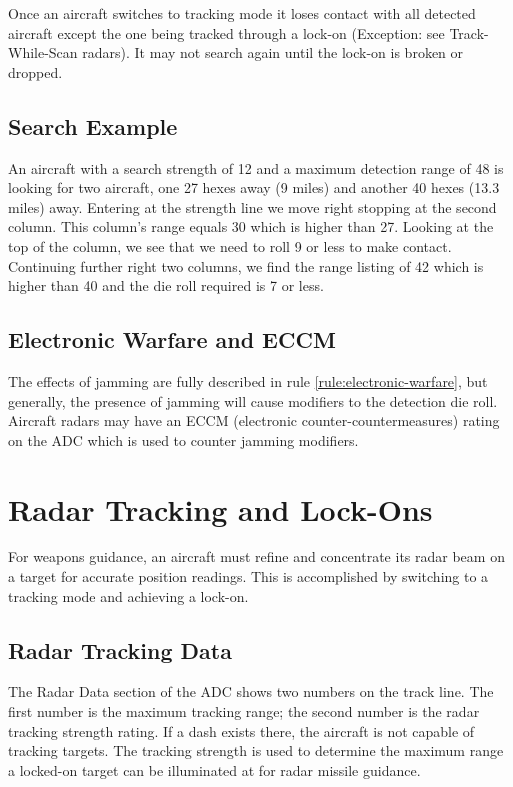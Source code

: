 Once an aircraft switches to tracking mode it loses contact with all detected aircraft except the one being tracked through a lock-on (Exception: see Track-While-Scan radars). It may not search again until the lock-on is broken or dropped. 

\subsection{Search Example} An aircraft with a search strength of 12 and a maximum detection range of 48 is looking for two aircraft, one 27 hexes away (9 miles) and another 40 hexes (13.3 miles) away. Entering at the strength line we move right stopping at the second column. This column's range equals 30 which is higher than 27. Looking at the top of the column, we see that we need to roll 9 or less to make contact. Continuing further right two columns, we find the range listing of 42 which is higher than 40 and the die roll required is 7 or less.

\subsection{Electronic Warfare and ECCM} The effects of jamming are fully described in rule \ref{rule:electronic-warfare}, but generally, the presence of jamming will cause modifiers to the detection die roll. Aircraft radars may have an ECCM (electronic counter-countermeasures) rating on the ADC which is used to counter jamming modifiers.

\section{Radar Tracking and Lock-Ons}
\label{rule:radar-tracking-and-lock-ons}

For weapons guidance, an aircraft must refine and concentrate its radar beam on a target for accurate position readings. This is accomplished by switching to a tracking mode and achieving a lock-on.

\subsection{Radar Tracking Data} The Radar Data section of the ADC shows two numbers on the track line. The first number is the maximum tracking range; the second number is the radar tracking strength rating. If a dash exists there, the aircraft is not capable of tracking targets. The tracking strength is used to determine the maximum range a locked-on target can be illuminated at for radar missile guidance.

